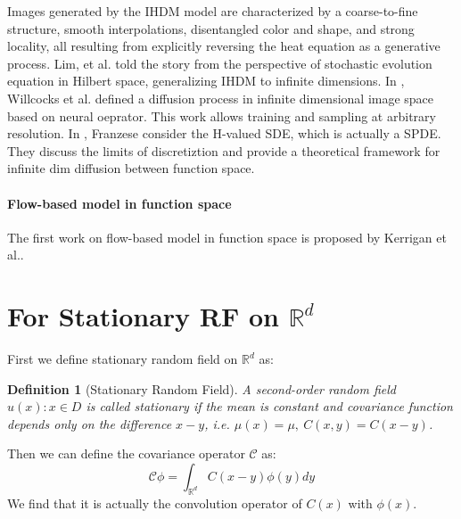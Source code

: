 \documentclass{article}
\newtheorem{definition}{Definition}
\begin{document}
Images generated by the IHDM model are characterized by a coarse-to-fine structure, smooth interpolations, disentangled color and shape, and strong locality, 
all resulting from explicitly reversing the heat equation as a generative process. 
Lim, et al.\cite{NEURIPS2023_76c6f9f2} told the story from the perspective of stochastic evolution equation in Hilbert space, generalizing IHDM to infinite dimensions. 
In \cite{bond2024infty}, Willcocks et al. defined a diffusion process in infinite dimensional image space based on neural oeprator.
This work allows training and sampling at arbitrary resolution.
In \cite{franzese2023continuoustimefunctionaldiffusionprocesses}, Franzese consider the H-valued SDE, which is actually a SPDE.
They discuss the limits of discretiztion and provide a theoretical framework for infinite dim diffusion between function space.

\paragraph{Flow-based model in function space}
The first work on flow-based model in function space is proposed by Kerrigan et al.\cite{kerrigan2023functionalflowmatching}. 


\cite{park2025stochasticoptimalcontroldiffusion}
\cite{baker2024conditioningnonlinearinfinitedimensionaldiffusion}
\cite{yang2024simulatinginfinitedimensionalnonlineardiffusion}
\cite{na2025probabilityflowodeinfinitedimensionalfunction}

\section{For Stationary RF on $\mathbb{R}^d$}
First we define stationary random field on $\mathbb{R}^d$ as:
\begin{definition}[Stationary Random Field]
  A second-order random field ${u(x): x\in D}$ is called stationary if the mean is constant and covariance function 
  depends only on the difference $x-y$, i.e. $\mu(x) = \mu,\ C(x, y) = C(x-y)$.
\end{definition}
Then we can define the covariance operator $\mathcal{C}$ as:
\begin{equation}
  \mathcal{C}\phi = \int_{\mathbb{R}^d} C(x-y)\phi(y)dy
\end{equation}
We find that it is actually the convolution operator of $C(x)$ with $\phi(x)$.
\end{document}
